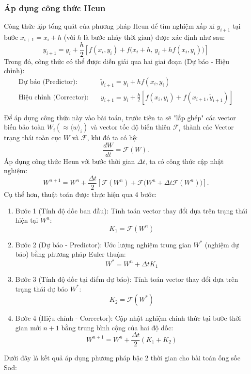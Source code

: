 \subsubsection{Áp dụng công thức Heun}
Công thức lặp tổng quát của phương pháp Heun để tìm nghiệm xấp xỉ $y_{i+1}$ tại bước $x_{i+1} = x_i + h$ (với $h$ là bước nhảy thời gian) được xác định như sau:
\begin{equation*}
    y_{i+1} = y_i + \frac{h}{2} \left[ f(x_i, y_i) + f\Big(x_i + h, \, y_i + h f(x_i, y_i)\Big)\right]
\end{equation*}
Trong đó, công thức có thể được diễn giải qua hai giai đoạn (Dự báo - Hiệu chỉnh):
\begin{align*}
    \text{Dự báo (Predictor):} & \quad \tilde{y}_{i+1} = y_i + h f(x_i, y_i) \\
    \text{Hiệu chỉnh (Corrector):} & \quad y_{i+1} = y_i + \frac{h}{2} \left[ f(x_i, y_i) + f(x_{i+1}, \tilde{y}_{i+1}) \right]
\end{align*}

\noindent Để áp dụng công thức này vào bài toán, trước tiên ta sẽ "lắp ghép" các vector biến bảo toàn $W_i (\approx \langle w \rangle_i)$ và vector tốc độ biến thiên $\mathcal{F}_i$ thành các Vector trạng thái toàn cục $W$ và $\mathcal{F}$, khi đó ta có hệ:
\[
\dfrac{dW}{dt} = \mathcal{F}(W).
\]
Áp dụng công thức Heun với bước thời gian $\Delta t$, ta có công thức cập nhật nghiệm:
\[
W^{n+1} = W^n + \frac{\Delta t}{2} \left[ \mathcal{F}(W^n) + \mathcal{F}\Big(W^n + \Delta t \mathcal{F}(W^n)\Big)\right].
\]
Cụ thể hơn, thuật toán được thực hiện qua 4 bước:
\begin{enumerate}
    \item Bước 1 (Tính độ dốc ban đầu):
    Tính toán vector thay đổi dựa trên trạng thái hiện tại $W^n$:
    \begin{equation*}
        K_1 = \mathcal{F}(W^n)
    \end{equation*}

    \item Bước 2 (Dự báo - Predictor):
    Ước lượng nghiệm trung gian $W^*$ (nghiệm dự báo) bằng phương pháp Euler thuận:
    \begin{equation*}
        W^* = W^n + \Delta t K_1
    \end{equation*}

    \item Bước 3 (Tính độ dốc tại điểm dự báo):
    Tính toán vector thay đổi dựa trên trạng thái dự báo $W^*$:
    \begin{equation*}
        K_2 = \mathcal{F}(W^*)
    \end{equation*}

    \item Bước 4 (Hiệu chỉnh - Corrector):
    Cập nhật nghiệm chính thức tại bước thời gian mới $n+1$ bằng trung bình cộng của hai độ dốc:
    \begin{equation*}
        W^{n+1} = W^n + \frac{\Delta t}{2} (K_1 + K_2)
    \end{equation*}
\end{enumerate}

Dưới đây là kết quả áp dụng phương pháp bậc 2 thời gian cho bài toán ống sốc Sod:



